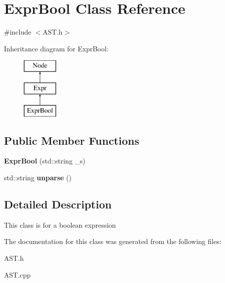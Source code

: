 \hypertarget{classExprBool}{\section{Expr\-Bool Class Reference}
\label{classExprBool}
}


{\ttfamily \#include $<$A\-S\-T.\-h$>$}

Inheritance diagram for Expr\-Bool\-:\begin{figure}[H]
\begin{center}
\leavevmode
\includegraphics[height=3.000000cm]{classExprBool}
\end{center}
\end{figure}
\subsection*{Public Member Functions}
\begin{DoxyCompactItemize}
\item 
\hypertarget{classExprBool_a4b26eddd21c9659fd94b08fda439956c}{{\bfseries Expr\-Bool} (std\-::string \-\_\-s)}\label{classExprBool_a4b26eddd21c9659fd94b08fda439956c}

\item 
\hypertarget{classExprBool_a925cf97ad93ef6a35cce600ed80f4b5a}{std\-::string {\bfseries unparse} ()}\label{classExprBool_a925cf97ad93ef6a35cce600ed80f4b5a}

\end{DoxyCompactItemize}


\subsection{Detailed Description}
This class is for a boolean expression 

The documentation for this class was generated from the following files\-:\begin{DoxyCompactItemize}
\item 
A\-S\-T.\-h\item 
A\-S\-T.\-cpp\end{DoxyCompactItemize}
